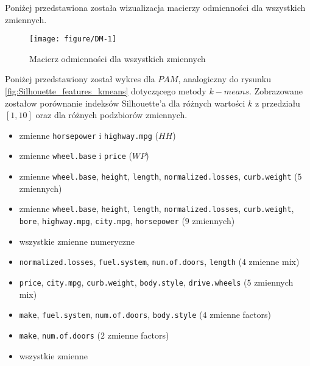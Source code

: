 \documentclass[12pt, a4paper]{article}\usepackage[]{graphicx}\usepackage[]{xcolor}
\makeatletter
\def\maxwidth{ %
  \ifdim\Gin@nat@width>\linewidth
    \linewidth
  \else
    \Gin@nat@width
  \fi
}
\newenvironment{knitrout}{}{} %
\makeatother
\begin{document}
Poniżej przedstawiona została wizualizacja macierzy odmienności dla wszystkich zmiennych.

\begin{knitrout}
\color{fgcolor}\begin{figure}[H]

{\centering \texttt{[image: figure/DM-1]} 

}

\caption[Macierz odmienności dla wszystkich zmiennych]{Macierz odmienności dla wszystkich zmiennych}\label{fig:DM}
\end{figure}

\end{knitrout}

\par

Poniżej przedstawiony został wykres dla $PAM$, analogiczny do rysunku \ref{fig:Silhouette_features_kmeans} dotyczącego metody $k-means$. Zobrazowane zostałow porównanie indeksów Silhouette'a dla różnych wartości $k$ z przedziału $[1,10]$ oraz dla różnych podzbiorów zmiennych. 

\begin{itemize}
\item zmienne \texttt{horsepower} i \texttt{highway.mpg} ($HH$)
\item zmienne \texttt{wheel.base} i \texttt{price} ($WP$) 
\item zmienne \texttt{wheel.base}, \texttt{height}, \texttt{length}, \texttt{normalized.losses}, \texttt{curb.weight} ($5$ zmiennych)
\item zmienne \texttt{wheel.base}, \texttt{height}, \texttt{length}, \texttt{normalized.losses}, \texttt{curb.weight}, \texttt{bore}, \texttt{highway.mpg}, \texttt{city.mpg}, \texttt{horsepower} ($9$ zmiennych)
\item wszystkie zmienne numeryczne
\item \texttt{normalized.losses}, \texttt{fuel.system}, \texttt{num.of.doors}, \texttt{length} ($4$ zmienne mix)
\item \texttt{price}, \texttt{city.mpg}, \texttt{curb.weight}, \texttt{body.style}, \texttt{drive.wheels} ($5$ zmiennych mix)
\item \texttt{make}, \texttt{fuel.system}, \texttt{num.of.doors}, \texttt{body.style} ($4$ zmienne factors)
\item \texttt{make}, \texttt{num.of.doors} ($2$ zmienne factors)
\item wszystkie zmienne

\end{itemize}
\end{document}
